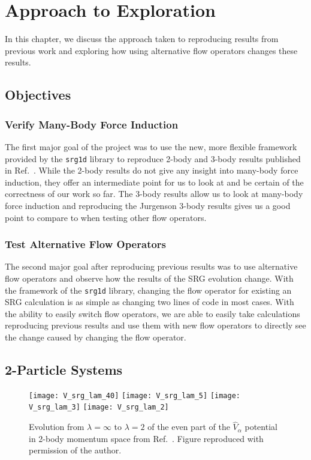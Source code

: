 \chapter{Approach to Exploration}\label{methods}

In this chapter, we discuss the approach taken to reproducing results from previous work and exploring how using alternative flow operators changes these results.

\section{Objectives}

\subsection{Verify Many-Body Force Induction}

The first major goal of the project was to use the new, more flexible framework provided by the \texttt{srg1d} library to reproduce 2-body and 3-body results published in Ref.~\cite{Jurgenson:2008jp}. While the 2-body results do not give any insight into many-body force induction, they offer an intermediate point for us to look at and be certain of the correctness of our work so far. The 3-body results allow us to look at many-body force induction and reproducing the Jurgenson 3-body results gives us a good point to compare to when testing other flow operators.

\subsection{Test Alternative Flow Operators}

The second major goal after reproducing previous results was to use alternative flow operators and observe how the results of the SRG evolution change. With the framework of the \texttt{srg1d} library, changing the flow operator for existing an SRG calculation is as simple as changing two lines of code in most cases. With the ability to easily switch flow operators, we are able to easily take calculations reproducing previous results and use them with new flow operators to directly see the change caused by changing the flow operator.

\section{2-Particle Systems}
\begin{figure}[t]
\begin{center}
 \texttt{[image: V\_srg\_lam\_40]}
\texttt{[image: V\_srg\_lam\_5]}
 \texttt{[image: V\_srg\_lam\_3]}
 \texttt{[image: V\_srg\_lam\_2]}
\end{center}
\caption{Evolution from $\lambda=\infty$ to $\lambda=2$ of the even part of the $\hat{V}_\alpha$ potential in 2-body momentum space from Ref.~\cite{Jurgenson:2008jp}. Figure reproduced with permission of the author.}
\label{fig:jurg_2body_ev}
\end{figure}

